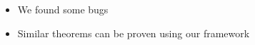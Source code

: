 \begin{itemize}
    \item We found some bugs 
    \item Similar theorems can be proven using our framework

\end{itemize}
